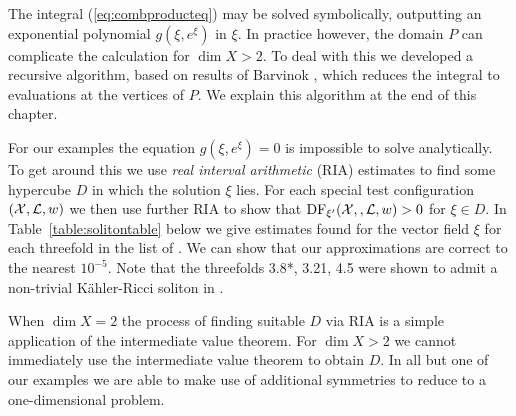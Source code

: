 The integral (\ref{eq:combproducteq}) may be solved symbolically, outputting an exponential polynomial \(g(\xi, e^{\xi})\) in \(\xi\). In practice however, the domain \(P\) can complicate the calculation for \(\dim X > 2\). To deal with this we developed a recursive algorithm, based on results of Barvinok \cite{Barvinok1992}, which reduces the integral to evaluations at the vertices of \(P\). We explain this algorithm at the end of this chapter.

For our examples the equation \(g(\xi,e^{\xi}) = 0\) is impossible to solve analytically. To get around this we use \textit{real interval arithmetic} (RIA) estimates to find some hypercube \(D\) in which the solution \(\xi\) lies. For each special test configuration \(({\mathcal{X}},\mathcal{L},w)\) we then use further RIA to show that \(\mathop{\rm DF}\nolimits_{\xi'}({\mathcal{X}},,\mathcal{L},w)>0\) for \(\xi \in D\). In Table~\ref{table:solitontable} below we give estimates found for the vector field \(\xi\) for each threefold in the list of \cite{suss2013fano}.  We can show that our approximations are correct to the nearest \(10^{-5}\). Note that the threefolds 3.8*, 3.21, 4.5 were shown to admit a non-trivial K\"ahler-Ricci soliton in \cite{ilten2015}.

When \(\dim  X = 2\) the process of finding suitable \(D\) via RIA is a simple application of the intermediate value theorem. For \(\dim X >2 \) we cannot immediately use the intermediate value theorem to obtain \(D\). In all but one of our examples we are able to make use of additional symmetries to reduce to a one-dimensional problem.

